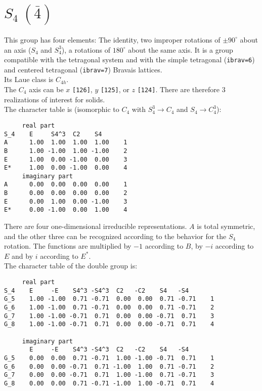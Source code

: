 \documentclass[12pt,a4paper,twoside]{report}
\begin{document}
\newpage
{\color{coral}\section{$S_4\ (\bar 4)$}}  
\color{black}
This group has four elements: The identity, two improper rotations 
of $\pm90^\circ$ about an axis ($S_4$ and $S_4^3$),  
a rotations of $180^\circ$ about the same axis. 
It is a group compatible with the tetragonal system and with the  
simple tetragonal (\texttt{ibrav=6}) and centered tetragonal 
(\texttt{ibrav=7}) Bravais lattices. \\
Its Laue class is $C_{4h}$. \\
The $C_4$ axis can be $x$ \texttt{[126]}, $y$ \texttt{[125]}, 
or $z$ \texttt{[124]}. There are therefore $3$ realizations
of interest for solids. \\ 
The character table is (isomorphic to $C_4$ with $S_4^3 \rightarrow C_4$ and
$S_4 \rightarrow C_4^3$):
\begin{tcolorbox}
\begin{footnotesize}
\begin{verbatim}
     real part
S_4    E     S4^3  C2    S4   
A      1.00  1.00  1.00  1.00    1
B      1.00 -1.00  1.00 -1.00    2
E      1.00  0.00 -1.00  0.00    3
E*     1.00  0.00 -1.00  0.00    4
     imaginary part
A      0.00  0.00  0.00  0.00    1
B      0.00  0.00  0.00  0.00    2
E      0.00  1.00  0.00 -1.00    3
E*     0.00 -1.00  0.00  1.00    4
\end{verbatim}
\end{footnotesize}
\end{tcolorbox}

There are four one-dimensional irreducible representations. $A$ is total
symmetric, and the other three can be recognized according to the behavior
for the $S_4$ rotation. The functions are multiplied by $-1$ according to
$B$, by $-i$ according to $E$ and by $i$ according to $E^*$.\\
The character table of the double group is:

\begin{tcolorbox}
\begin{footnotesize}
\begin{verbatim}
     real part
S_4    E     -E    S4^3 -S4^3  C2   -C2    S4   -S4  
G_5    1.00 -1.00  0.71 -0.71  0.00  0.00  0.71 -0.71    1
G_6    1.00 -1.00  0.71 -0.71  0.00  0.00  0.71 -0.71    2
G_7    1.00 -1.00 -0.71  0.71  0.00  0.00 -0.71  0.71    3
G_8    1.00 -1.00 -0.71  0.71  0.00  0.00 -0.71  0.71    4

     imaginary part
       E     -E    S4^3 -S4^3  C2   -C2    S4   -S4  
G_5    0.00  0.00  0.71 -0.71  1.00 -1.00 -0.71  0.71    1
G_6    0.00  0.00 -0.71  0.71 -1.00  1.00  0.71 -0.71    2
G_7    0.00  0.00 -0.71  0.71  1.00 -1.00  0.71 -0.71    3
G_8    0.00  0.00  0.71 -0.71 -1.00  1.00 -0.71  0.71    4
\end{verbatim}
\end{footnotesize}
\end{tcolorbox}
\end{document}

